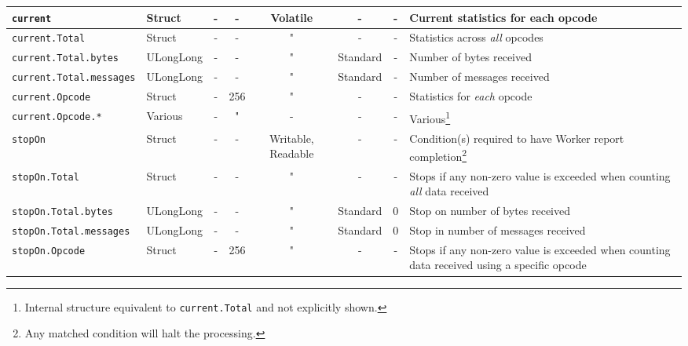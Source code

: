 \documentclass{article}
\begin{document}
\begin{landscape}
\begin{minipage}{\textwidth}
\begin{scriptsize}
\begin{tabular}{|p{3cm}|p{1.5cm}|c|c|c|c|c|p{7cm}|}
      \hline
      \verb+current+                & Struct    & -              & -               & Volatile           & -           & -             & Current statistics for each opcode \\
      \hline
      \verb+current.Total+          & Struct    & -              & -               & "                  & -           & -             & Statistics across \textit{all} opcodes \\
      \hline
      \verb+current.Total.bytes+    & ULongLong & -              & -               & "                  & Standard    & -             & Number of bytes received \\
      \hline
      \verb+current.Total.messages+ & ULongLong & -              & -               & "                  & Standard    & -             & Number of messages received \\
      \hline
      \verb+current.Opcode+         & Struct    & -              & 256             & "                  & -           & -             & Statistics for \textit{each} opcode \\
      \hline
      \verb+current.Opcode.*+       & Various   & -              & "               & -                  & -           & -             & Various\footnote{Internal structure equivalent to \texttt{current.Total} and not explicitly shown.} \\
      \hline
      \verb+stopOn+                 & Struct    & -              & -               & Writable, Readable & -           & -             & Condition(s) required to have Worker report completion\footnote{Any matched condition will halt the processing.} \\
      \hline
      \verb+stopOn.Total+           & Struct    & -              & -               & "                  & -           & -             & Stops if any non-zero value is exceeded when counting \textit{all} data received \\
      \hline
      \verb+stopOn.Total.bytes+     & ULongLong & -              & -               & "                  & Standard    & 0             & Stop on number of bytes received \\
      \hline
      \verb+stopOn.Total.messages+  & ULongLong & -              & -               & "                  & Standard    & 0             & Stop in number of messages received \\
      \hline
      \verb+stopOn.Opcode+          & Struct    & -              & 256             & "                  & -           & -             & Stops if any non-zero value is exceeded when counting data received using a specific opcode \\

\end{tabular}
\end{scriptsize}
\end{minipage}
\end{landscape}
\end{document}
